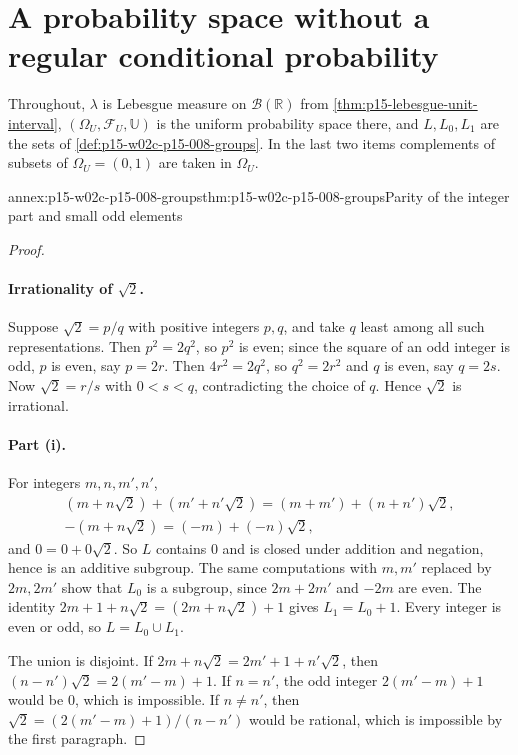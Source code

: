 \section{A probability space without a regular conditional probability}
\label{sec:annex-p15-w02c-p15-008-no-rcp}

Throughout, \(\lambda\) is Lebesgue measure on \(\mathcal B(\mathbb R)\)
from \cref{thm:p15-lebesgue-unit-interval},
\((\Omega_U,\mathcal F_U,\mathbb U)\) is the uniform probability space
there, and \(L,L_0,L_1\) are the sets of
\cref{def:p15-w02c-p15-008-groups}. In the last two items complements of
subsets of \(\Omega_U=(0,1)\) are taken in \(\Omega_U\).

\begin{annexitem}{annex:p15-w02c-p15-008-groups}{thm:p15-w02c-p15-008-groups}{Parity of the integer part and small odd elements}
\begin{proof}
\paragraph{Irrationality of \(\sqrt2\).}
Suppose \(\sqrt2=p/q\) with positive integers \(p,q\), and take \(q\)
least among all such representations. Then \(p^2=2q^2\), so \(p^2\) is
even; since the square of an odd integer is odd, \(p\) is even, say
\(p=2r\). Then \(4r^2=2q^2\), so \(q^2=2r^2\) and \(q\) is even, say
\(q=2s\). Now \(\sqrt2=r/s\) with \(0<s<q\), contradicting the choice
of \(q\). Hence \(\sqrt2\) is irrational.

\paragraph{Part (i).}
For integers \(m,n,m',n'\),
\[
 \begin{gathered}
 (m+n\sqrt2)+(m'+n'\sqrt2)=(m+m')+(n+n')\sqrt2,\\
 -(m+n\sqrt2)=(-m)+(-n)\sqrt2,
 \end{gathered}
\]
and \(0=0+0\sqrt2\). So \(L\) contains \(0\) and is closed under
addition and negation, hence is an additive subgroup. The same
computations with \(m,m'\) replaced by \(2m,2m'\) show that \(L_0\) is a
subgroup, since \(2m+2m'\) and \(-2m\) are even. The identity
\(2m+1+n\sqrt2=(2m+n\sqrt2)+1\) gives \(L_1=L_0+1\). Every integer is
even or odd, so \(L=L_0\cup L_1\).

The union is disjoint. If \(2m+n\sqrt2=2m'+1+n'\sqrt2\), then
\((n-n')\sqrt2=2(m'-m)+1\). If \(n=n'\), the odd integer \(2(m'-m)+1\)
would be \(0\), which is impossible. If \(n\neq n'\), then
\(\sqrt2=(2(m'-m)+1)/(n-n')\) would be rational, which is impossible by
the first paragraph.


\end{proof}
\end{annexitem}
